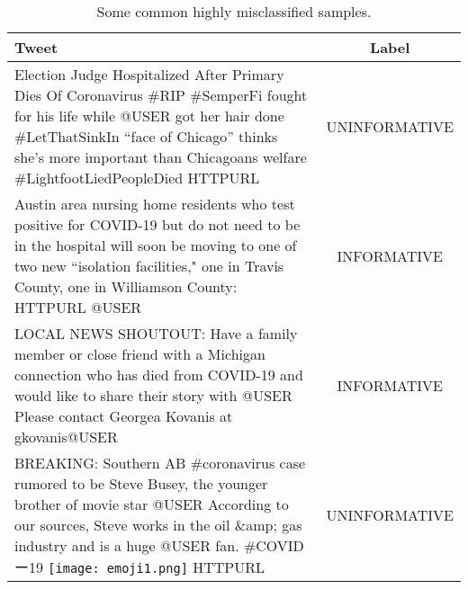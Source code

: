 \documentclass[11pt,a4paper]{article}
\begin{document}
\begin{table*}[bp]
\renewcommand\thetable{2}
\centering
\begin{tabular}{|l|c|}
\hline \hspace{5.5cm} \textbf{Tweet} & \textbf{Label} \\ \hline
\begin{minipage}{0.75\textwidth}
\vspace{0.15cm}
Election Judge Hospitalized After Primary Dies Of Coronavirus \#RIP \#SemperFi fought for his life while ⁦@USER got her hair done \#LetThatSinkIn “face of Chicago” thinks she’s more important than Chicagoans welfare \#LightfootLiedPeopleDied HTTPURL
\vspace{0.15cm}
\end{minipage} & UNINFORMATIVE\\

\hline
\begin{minipage}{0.75\textwidth}
\vspace{0.15cm}
Austin area nursing home residents who test positive for COVID-19 but do not need to be in the hospital will soon be moving to one of two new “isolation facilities," one in Travis County, one in Williamson County: HTTPURL @USER
\vspace{0.01cm}
\end{minipage} & INFORMATIVE \\ \hline

\begin{minipage}{0.75\textwidth}
\vspace{0.15cm}
LOCAL NEWS SHOUTOUT: Have a family member or close friend with a Michigan connection who has died from COVID-19 and would like to share their story with @USER Please contact Georgea Kovanis at gkovanis@USER
\vspace{0.15cm} 
\end{minipage} & INFORMATIVE \\ \hline

\begin{minipage}{0.75\textwidth}
\vspace{0.15cm}
BREAKING: Southern AB \#coronavirus case rumored to be Steve Busey, the younger brother of movie star @USER According to our sources, Steve works in the oil \&amp; gas industry and is a huge @USER fan. \#COVIDー19 \texttt{[image: emoji1.png]} HTTPURL 
\vspace{0.15cm} 
\end{minipage} & UNINFORMATIVE \\ \hline

\end{tabular}
\caption{\label{tab:topk} Some common highly misclassified samples.}
\end{table*}
\end{document}
